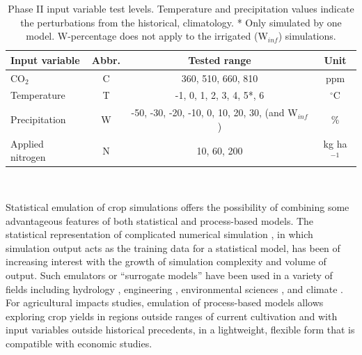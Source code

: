\documentclass[preprint, 5p, times, twocolumn]{elsarticle}
\begin{document}
\begin{table}[!b]
    \small \centering
    \begin{tabular}[0.75\linewidth]{lccc} 
        \hline \vspace{1mm}
        \textbf{Input variable} & \textbf{Abbr.} & \textbf{Tested range} & \textbf{Unit}\\ \hline \hline \vspace{1mm}
        {CO$_2$}& {C} & {360, 510, 660, 810} & {ppm}\\ \hline \vspace{1mm}
        {Temperature}& {T} & {-1, 0, 1, 2, 3, 4, 5*, 6} & {$^{\circ}$C}\\ \hline \vspace{1mm}
        {Precipitation}& {W} & {-50, -30, -20, -10, 0, 10, 20, 30, (and W$_{inf}$)} & {\%}\\ \hline \vspace{1mm}
        {Applied nitrogen}& {N} & {10, 60, 200} & {kg ha$^{-1}$}\\ \hline
    \end{tabular}\\
    \parbox{11cm}{\caption{Phase II input variable test levels. Temperature and precipitation values indicate the perturbations from the historical, climatology. * Only simulated by one model. W-percentage does not apply to the irrigated (W$_{inf}$) simulations.}}
    \label{table:inputs}
\end{table}

Statistical emulation of crop simulations offers the possibility of combining some advantageous features of both statistical and process-based models. The statistical representation of complicated numerical simulation \citep[e.g.\ ][]{OHAGAN2006, OHAGAN2010}, in which simulation output acts as the training data for a statistical model, has been of increasing interest with the growth of simulation complexity and volume of output. Such emulators or ``surrogate models'' have been used in a variety of fields including hydrology \citep{Razavi2012}, engineering \citep{STORLIE2009}, environmental sciences \citep{RATTO2012}, and climate \citep{Castruccio14}. For agricultural impacts studies, emulation of process-based models allows exploring crop yields in regions outside ranges of current cultivation and with input variables outside historical precedents, in a lightweight, flexible form that is compatible with economic studies. 
\end{document}
